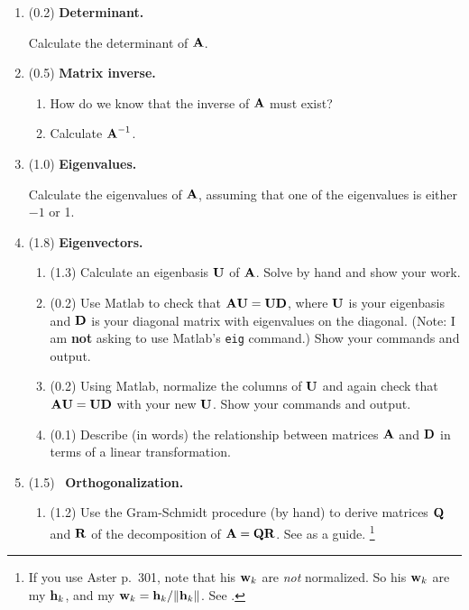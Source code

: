 \begin{enumerate}
\item (0.2) {\bf Determinant.}

Calculate the determinant of $\mbox{${\bf A}$}$.

\item (0.5) {\bf Matrix inverse.}

\begin{enumerate}
\item How do we know that the inverse of $\mbox{${\bf A}$}$ must exist?
\item Calculate $\mbox{${\bf A}$}^{-1}$.
\end{enumerate}

\item (1.0) {\bf Eigenvalues.}

Calculate the eigenvalues of $\mbox{${\bf A}$}$, assuming that one of the eigenvalues is either $-1$ or 1.

\item (1.8) {\bf Eigenvectors.}

\begin{enumerate}
\item (1.3) Calculate an eigenbasis $\mbox{${\bf U}$}$ of $\mbox{${\bf A}$}$. Solve by hand and show your work.

\item (0.2) Use Matlab to check that $\mbox{${\bf A}$}\mbox{${\bf U}$} = \mbox{${\bf U}$}\mbox{${\bf D}$}$, where $\mbox{${\bf U}$}$ is your eigenbasis and $\mbox{${\bf D}$}$ is your diagonal matrix with eigenvalues on the diagonal. (Note: I am {\bf not} asking to use Matlab's \verb+eig+ command.) Show your commands and output.

\item (0.2) Using Matlab, normalize the columns of $\mbox{${\bf U}$}$ and again check that $\mbox{${\bf A}$}\mbox{${\bf U}$} = \mbox{${\bf U}$}\mbox{${\bf D}$}$ with your new $\mbox{${\bf U}$}$. Show your commands and output.

\item (0.1) Describe (in words) the relationship between matrices $\mbox{${\bf A}$}$ and $\mbox{${\bf D}$}$ in terms of a linear transformation.

\end{enumerate}

\pagebreak
\item (1.5) \ptag\ {\bf Orthogonalization.}

\begin{enumerate}
\item (1.2) Use the Gram-Schmidt procedure (by hand) to derive matrices $\mbox{${\bf Q}$}$ and $\mbox{${\bf R}$}$ of the decomposition of $\mbox{${\bf A}$} = \mbox{${\bf Q}$}\mbox{${\bf R}$}$. See  as a guide.
\footnote{If you use Aster p.~301, note that his $\mbox{${\bf w}$}_k$ are {\em not} normalized. So his $\mbox{${\bf w}$}_k$ are my $\mbox{${\bf h}$}_k$, and my $\mbox{${\bf w}$}_k = \mbox{${\bf h}$}_k/\|\mbox{${\bf h}$}_k\|$. See .}


\end{enumerate}
\end{enumerate}
